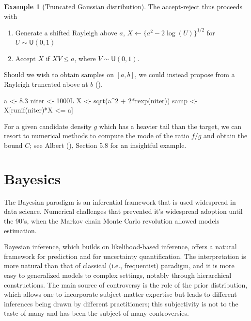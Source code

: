 \documentclass[
  11pt,
  letterpaper,
]{scrbook}
\newenvironment{Shaded}{\begin{snugshade}}{\end{snugshade}}
\newcommand{\DecValTok}[1]{\textcolor[rgb]{0.68,0.00,0.00}{#1}}
\newcommand{\FloatTok}[1]{\textcolor[rgb]{0.68,0.00,0.00}{#1}}
\newcommand{\FunctionTok}[1]{\textcolor[rgb]{0.28,0.35,0.67}{#1}}
\newcommand{\NormalTok}[1]{\textcolor[rgb]{0.00,0.23,0.31}{#1}}
\newcommand{\OtherTok}[1]{\textcolor[rgb]{0.00,0.23,0.31}{#1}}
\newcommand{\SpecialCharTok}[1]{\textcolor[rgb]{0.37,0.37,0.37}{#1}}
\providecommand{\tightlist}{%
  \setlength{\itemsep}{0pt}\setlength{\parskip}{0pt}}\usepackage{longtable,booktabs,array}
\theoremstyle{definition}
\theoremstyle{plain}
\theoremstyle{plain}
\theoremstyle{definition}
\newtheorem{example}{Example}[chapter]
\theoremstyle{definition}
\theoremstyle{remark}
\begin{document}
\begin{example}[Truncated Gaussian
distribution]
The accept-reject thus proceeds with

\begin{enumerate}
\def\labelenumi{\arabic{enumi}.}
\tightlist
\item
  Generate a shifted Rayleigh above \(a\),
  \(X \gets  \{a^2 - 2\log(U)\}^{1/2}\) for \(U \sim \mathsf{U}(0,1)\)
\item
  Accept \(X\) if \(XV \leq a\), where \(V \sim \mathsf{U}(0,1)\).
\end{enumerate}

Should we wish to obtain samples on \([a,b]\), we could instead propose
from a Rayleigh truncated above at \(b\)
().

\begin{Shaded}
\begin{Highlighting}[]
\NormalTok{a }\OtherTok{\textless{}{-}} \FloatTok{8.3}
\NormalTok{niter }\OtherTok{\textless{}{-}} \DecValTok{1000}\NormalTok{L}
\NormalTok{X }\OtherTok{\textless{}{-}} \FunctionTok{sqrt}\NormalTok{(a}\SpecialCharTok{\^{}}\DecValTok{2} \SpecialCharTok{+} \DecValTok{2}\SpecialCharTok{*}\FunctionTok{rexp}\NormalTok{(niter))}
\NormalTok{samp }\OtherTok{\textless{}{-}}\NormalTok{ X[}\FunctionTok{runif}\NormalTok{(niter)}\SpecialCharTok{*}\NormalTok{X }\SpecialCharTok{\textless{}=}\NormalTok{ a]}
\end{Highlighting}
\end{Shaded}

\end{example}

For a given candidate density \(g\) which has a heavier tail than the
target, we can resort to numerical methods to compute the mode of the
ratio \(f/g\) and obtain the bound \(C\); see Albert
(), Section 5.8 for an insightful
example.


\chapter{Bayesics}\label{bayesics}

The Bayesian paradigm is an inferential framework that is used
widespread in data science. Numerical challenges that prevented it's
widespread adoption until the 90's, when the Markov chain Monte Carlo
revolution allowed models estimation.

Bayesian inference, which builds on likelihood-based inference, offers a
natural framework for prediction and for uncertainty quantification. The
interpretation is more natural than that of classical (i.e.,
frequentist) paradigm, and it is more easy to generalized models to
complex settings, notably through hierarchical constructions. The main
source of controversy is the role of the prior distribution, which
allows one to incorporate subject-matter expertise but leads to
different inferences being drawn by different practitioners; this
subjectivity is not to the taste of many and has been the subject of
many controversies.
\end{document}
